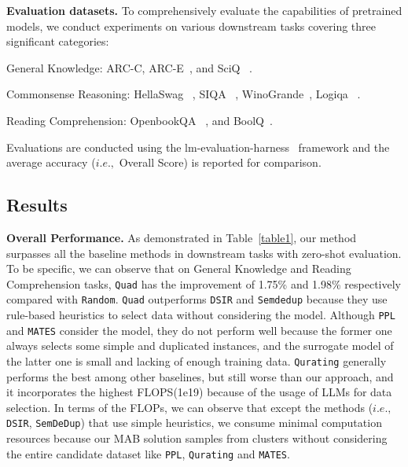 \documentclass{article} %
\begin{document}
\textbf{Evaluation datasets.}
To comprehensively evaluate the capabilities of pretrained models, we conduct  experiments on various downstream tasks covering three significant categories:

General Knowledge: ARC-C, ARC-E~\citep{clark2018think}, and SciQ ~\citep{welbl2017crowdsourcing}.

Commonsense Reasoning: HellaSwag ~\citep{zellers2019hellaswag}, SIQA ~\citep{sap2019social}, WinoGrande~\citep{sakaguchi2021winogrande}, Logiqa ~\citep{liu2020logiqa}.

Reading Comprehension: OpenbookQA ~\citep{mihaylov2018can}, and BoolQ~\citep{clark2019boolq}.

Evaluations are conducted using the lm-evaluation-harness~\citep{gao10256836framework} framework  and the average accuracy ($i.e.,$ Overall Score) is reported for comparison.



\subsection{Results}

\textbf{Overall Performance.}
As demonstrated in Table~\ref{table1}, our method surpasses all the baseline methods in downstream tasks with zero-shot evaluation. 
To be specific, we can observe that on General Knowledge and Reading Comprehension tasks, \texttt{Quad} has the improvement of 1.75\% and 1.98\% respectively compared with \texttt{Random}.
\texttt{Quad} outperforms \texttt{DSIR} and \texttt{Semdedup} because they use rule-based heuristics to select data without considering the model. Although \texttt{PPL} and \texttt{MATES} consider the model, they do not perform well because the former one always selects some simple and duplicated instances, and the surrogate model of the latter one is small and lacking of enough training data.  \texttt{Qurating} generally performs the best among other baselines, but still worse than our approach, and it incorporates the highest FLOPS(1e19) because of the usage of LLMs for data selection.
 In terms of the FLOPs, we can observe that except the methods ($i.e.,$ \texttt{DSIR}, \texttt{SemDeDup}) that use simple heuristics, we consume minimal computation resources because our MAB solution samples from clusters without considering the entire candidate dataset like \texttt{PPL}, \texttt{Qurating} and \texttt{MATES}.
 
\end{document}
